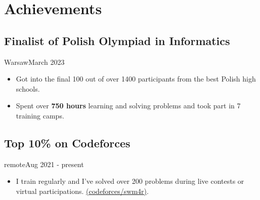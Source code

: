 \section{Achievements}
\subsection{Finalist of Polish Olympiad in Informatics}{Warsaw}{March 2023}
\begin{itemize}
    \item Got into the final 100 out of over 1400 participants from the best Polish high schools.
    \item Spent over \textbf{750 hours} learning and solving problems and took part in 7 training camps.
\end{itemize}

\subsection{Top 10\% on Codeforces}{remote}{Aug 2021 - present}
\begin{itemize}
    \item I train regularly and I've solved over 200 problems during live contests or virtual participations. \href{https://codeforces.com/profile/swm4r}{(codeforces/swm4r)}.
\end{itemize}

\vspace{1em}
